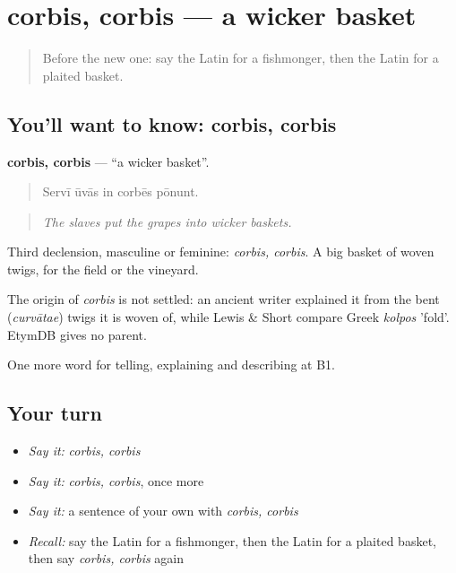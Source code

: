 \section[corbis, corbis]{corbis, corbis — a wicker basket}

\label{lesson:LA-C463-corbis}



\begin{quote}
Before the new one: say the Latin for a fishmonger, then the Latin for a plaited basket.
\end{quote}

\subsection*{You'll want to know: corbis, corbis}
\textbf{corbis, corbis} — \textquotedblleft{}a wicker basket\textquotedblright{}.

\begin{quote}
Servī ūvās in corbēs pōnunt.
\end{quote}

\begin{quote}
\emph{The slaves put the grapes into wicker baskets.}
\end{quote}

Third declension, masculine or feminine: \emph{corbis, corbis}. A big basket of woven twigs, for the field or the vineyard.

\begin{cousinweb}
The origin of \emph{corbis} is not settled: an ancient writer explained it from the bent (\emph{curvātae}) twigs it is woven of, while Lewis \& Short compare Greek \emph{kolpos} 'fold'. EtymDB gives no parent.
\end{cousinweb}

\begin{grammarlens}[title={What you've built}]
One more word for telling, explaining and describing at B1.
\end{grammarlens}

\subsection*{Your turn}
\begin{itemize}
\raggedright
  \item \emph{Say it:} \emph{corbis, corbis}
  \item \emph{Say it:} \emph{corbis, corbis}, once more
  \item \emph{Say it:} a sentence of your own with \emph{corbis, corbis}
  \item \emph{Recall:} say the Latin for a fishmonger, then the Latin for a plaited basket, then say \emph{corbis, corbis} again
\end{itemize}

